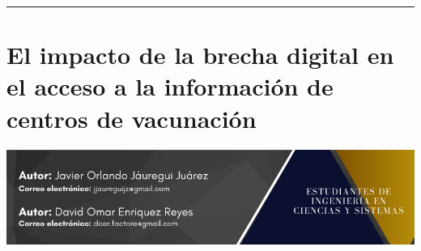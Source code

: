 \documentclass[12pt,spanish,Letterpaper,openany]{book}
\newcommand{\HRule}{\begin{center}\rule{0.5\linewidth}{0.2mm}\end{center}}
\begin{document}
\medskip

\HRule

\medskip

\hypertarget{pareja1}{%
\chapter{El impacto de la brecha digital en el acceso a la información de centros de vacunación}\label{pareja1}}

\begin{center}\includegraphics[width=1\linewidth]{images/pareja1_01} \end{center}
\end{document}
